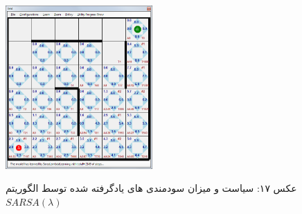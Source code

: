 \documentclass[10pt,a4paper]{article}
\begin{document}
\begin{figure}[H]
    \centering
    \includegraphics[width=0.5\textwidth]{rlambda}
    \begin{center}
    \textarabic{عکس ۱۷: سیاست و میزان سودمندی های یادگرفته شده توسط الگوریتم $SARSA(\lambda)$ }
    \end{center}
\end{figure}
\end{document}
